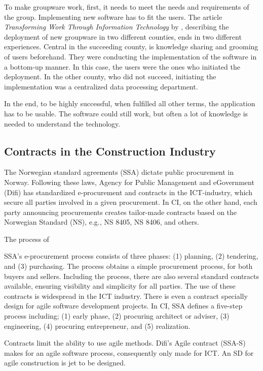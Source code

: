 To make groupware work, first, it needs to meet the needs and requirements of the group. Implementing new software has to fit the users. The article \textit{Transforming Work Through Information Technology} by \cite{Robey&Sahay}, describing the deployment of new groupware in two different counties, ends in two different experiences. Central in the succeeding county, is knowledge sharing and grooming of users beforehand. They were conducting the implementation of the software in a bottom-up manner. In this case, the users were the ones who initiated the deployment. In the other county, who did not succeed, initiating the implementation was a centralized data processing department. 

In the end, to be highly successful, when fulfilled all other terms, the application has to be usable. The software could still work, but often a lot of knowledge is needed to understand the technology. 

\subsection{Contracts in the Construction Industry}
The Norwegian standard agreements (SSA) dictate public procurement in Norway.  Following these laws, Agency for Public Management and eGovernment (Difi) has standardized e-procurement and contracts in the ICT-industry, which secure all parties involved in a given procurement. In CI, on the other hand, each party announcing procurements creates tailor-made contracts based on the Norwegian Standard (NS), e.g., NS 8405, NS 8406, and others. 

The process of 

SSA's e-procurement process consists of three phases: (1) planning, (2) tendering, and (3) purchasing. The process obtains a simple procurement process, for both buyers and sellers. Including the process, there are also several standard contracts available, ensuring visibility and simplicity for all parties. The use of these contracts is widespread in the ICT industry. There is even a contract specially design for agile software development projects. In CI, SSA defines a five-step process including; (1) early phase, (2) procuring architect or adviser, (3) engineering, (4) procuring entrepreneur, and (5) realization. 

Contracts limit the ability to use agile methods. Difi's Agile contract (SSA-S) makes for an agile software process, consequently only made for ICT. An SD for agile construction is jet to be designed. 


